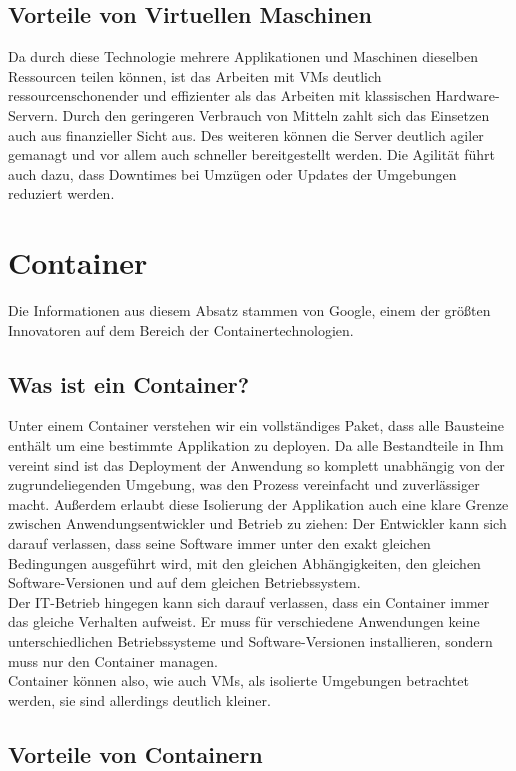 \subsection{Vorteile von Virtuellen Maschinen}
Da durch diese Technologie mehrere Applikationen und Maschinen dieselben Ressourcen teilen können, ist das Arbeiten mit \ac{VM}s deutlich ressourcenschonender und effizienter als das Arbeiten mit klassischen Hardware-Servern.
Durch den geringeren Verbrauch von Mitteln zahlt sich das Einsetzen auch aus finanzieller Sicht aus.
Des weiteren können die Server deutlich agiler gemanagt und vor allem auch schneller bereitgestellt werden.
Die Agilität führt auch dazu, dass Downtimes bei Umzügen oder Updates der Umgebungen reduziert werden.



\section{Container}
Die Informationen aus diesem Absatz stammen von Google\cite{containers}, einem der größten Innovatoren auf dem Bereich der Containertechnologien.
\subsection{Was ist ein Container?}
Unter einem Container verstehen wir ein vollständiges Paket, dass alle Bausteine enthält um eine bestimmte Applikation zu deployen.
Da alle Bestandteile in Ihm vereint sind ist das Deployment der Anwendung so komplett unabhängig von der zugrundeliegenden Umgebung, was den Prozess vereinfacht und zuverlässiger macht.
Außerdem erlaubt diese Isolierung der Applikation auch eine klare Grenze zwischen Anwendungsentwickler und Betrieb zu ziehen:
Der Entwickler kann sich darauf verlassen, dass seine Software immer unter den exakt gleichen Bedingungen ausgeführt wird, mit den gleichen Abhängigkeiten, den gleichen Software-Versionen und auf dem gleichen Betriebssystem.
\\
Der IT-Betrieb hingegen kann sich darauf verlassen, dass ein Container immer das gleiche Verhalten aufweist. 
Er muss für verschiedene Anwendungen keine unterschiedlichen Betriebssysteme und Software-Versionen installieren, sondern muss nur den Container managen.
\\
Container können also, wie auch \ac{VM}s, als isolierte Umgebungen betrachtet werden, sie sind allerdings deutlich kleiner.

\subsection{Vorteile von Containern}

